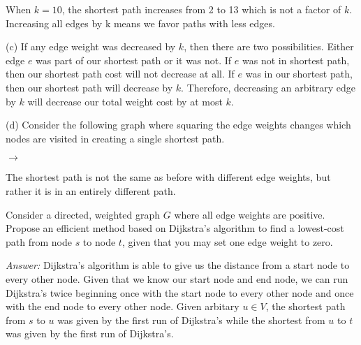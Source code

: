 \documentclass[12pt]{article}
\newenvironment{problem}[2][Problem]{\begin{trivlist}
\item[\hskip \labelsep {\bfseries #1}\hskip \labelsep {\bfseries #2.}]}{\end{trivlist}}
\begin{document}
When $k=10$, the shortest path increases from 2 to 13 which is not a factor of $k$. Increasing all edges by k means we favor paths with less edges.

(c) If any edge weight was decreased by $k$, then there are two possibilities. Either edge $e$ was part of our shortest path or it was not. If $e$ was not in shortest path, then our shortest path cost will not decrease at all. If $e$ was in our shortest path, then our shortest path will decrease by $k$. Therefore, decreasing an arbitrary edge by $k$ will decrease our total weight cost by at most $k$.

(d) Consider the following graph where squaring the edge weights changes which nodes are visited in creating a single shortest path.

$\rightarrow$

The shortest path is not the same as before with different edge weights, but rather it is in an entirely different path.
\begin{problem}{5}
    Consider a directed, weighted graph $G$ where all edge weights are positive. Propose an efficient method based on Dijkstra's algorithm to find a lowest-cost path from node $s$ to node $t$, given that you may set one edge weight to zero.
\end{problem}
\textit{Answer:} Dijkstra's algorithm is able to give us the distance from a start node to every other node. Given that we know our start node and end node, we can run Dijkstra's twice beginning once with the start node to every other node and once with the end node to every other node. Given arbitary $u\in V$, the shortest path from $s$ to $u$ was given by the first run of Dijkstra's while the shortest from $u$ to $t$ was given by the first run of Dijkstra's.
\end{document}
